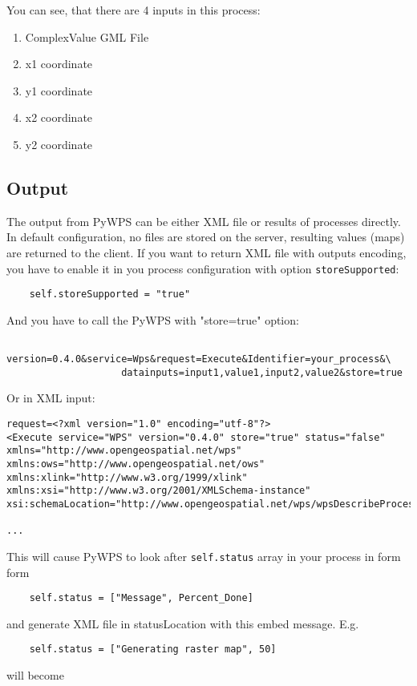 \documentclass[a4paper,11pt]{article}
\begin{document}
    You can see, that there are 4 inputs in this process: 
     
    \begin{enumerate}
            \item ComplexValue GML File 
            \item x1 coordinate 
            \item y1 coordinate 
            \item x2 coordinate 
            \item y2 coordinate 
    \end{enumerate}
    \subsection{Output}
     
    The output from PyWPS can be either XML file or results of processes directly. In default configuration, no files are stored on the server, resulting values (maps) are 
    returned to the client. If you want to return XML file with outputs
    encoding, you have to enable it in you process configuration with
    option \texttt{storeSupported}:
     
    \begin{verbatim}
    self.storeSupported = "true"
    \end{verbatim}
     
    And you have to call the PyWPS with "store=true" option:
     
    \begin{verbatim}
    version=0.4.0&service=Wps&request=Execute&Identifier=your_process&\
                    datainputs=input1,value1,input2,value2&store=true
    \end{verbatim}
     
    Or in XML input:
     
    \begin{verbatim}
request=<?xml version="1.0" encoding="utf-8"?>
<Execute service="WPS" version="0.4.0" store="true" status="false"
xmlns="http://www.opengeospatial.net/wps"
xmlns:ows="http://www.opengeospatial.net/ows"
xmlns:xlink="http://www.w3.org/1999/xlink"
xmlns:xsi="http://www.w3.org/2001/XMLSchema-instance"
xsi:schemaLocation="http://www.opengeospatial.net/wps/wpsDescribeProcess.xsd">

...
\end{verbatim}

This will cause PyWPS to look after \texttt{self.status} array in your process in form form 
\begin{verbatim}
    self.status = ["Message", Percent_Done]
\end{verbatim}
and generate XML file in statusLocation with this embed message. E.g.
\begin{verbatim}
    self.status = ["Generating raster map", 50]
\end{verbatim}
will become
\end{document}
